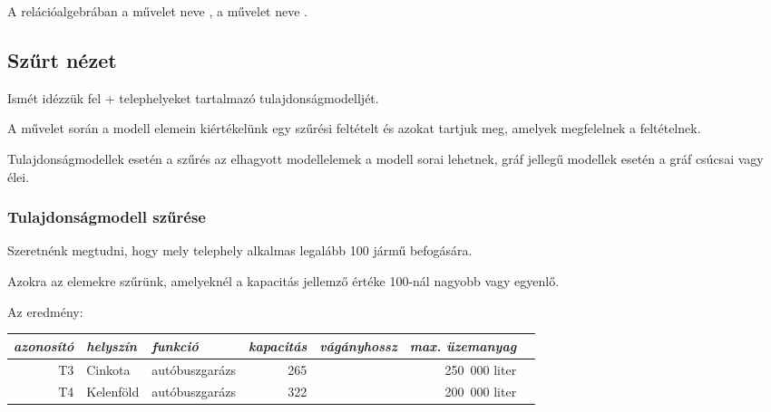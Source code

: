 \begin{megjegyzes}
	A relációalgebrában a  művelet neve , a  művelet neve .
\end{megjegyzes}

\subsection{Szűrt nézet}

Ismét idézzük fel \az+ telephelyeket tartalmazó tulajdonságmodelljét.

\begin{table}[H]
	\centering
	
\end{table}

\begin{definicio}
	A  művelet során a modell elemein kiértékelünk egy szűrési feltételt és azokat tartjuk meg, amelyek megfelelnek a feltételnek.
\end{definicio}

Tulajdonságmodellek esetén a szűrés az elhagyott modellelemek a modell sorai lehetnek, gráf jellegű modellek esetén a gráf csúcsai vagy élei.

\subsubsection{Tulajdonságmodell szűrése}

\begin{pelda}
	Szeretnénk megtudni, hogy mely telephely alkalmas legalább 100 jármű befogására.
\end{pelda}

Azokra az elemekre szűrünk, amelyeknél a \textsf{kapacitás} jellemző értéke 100-nál nagyobb vagy egyenlő.

Az eredmény:
\begin{table}[H]
	\centering
	\sf
	\centering
	\begin{tabular}{rllrrrr}
		\toprule
		\it azonosító & \it helyszín & \it funkció      & \it kapacitás & \it vágányhossz & \it max. üzemanyag &  \\ \midrule
		T3 & Cinkota      & autóbuszgarázs   &           265 &                 &      250~000 liter &  \\
		T4 & Kelenföld    & autóbuszgarázs   &           322 &                 &      200~000 liter &  \\ 
		\bottomrule
	\end{tabular}
\end{table}
	

